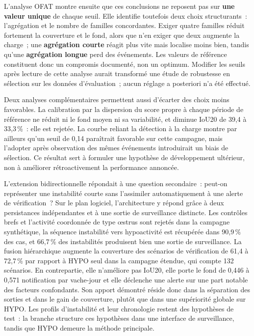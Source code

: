 L'analyse OFAT montre ensuite que ces conclusions ne reposent pas sur \textbf{une valeur unique} de
chaque seuil. Elle identifie toutefois deux choix structurants~: l'agrégation et le nombre de
familles concordantes. Exiger quatre familles réduit fortement la couverture et le fond, alors
que n'en exiger que deux augmente la charge~; une \textbf{agrégation courte} réagit plus vite mais
localise moins bien, tandis qu'une \textbf{agrégation longue} perd des événements. Les valeurs de
référence constituent donc un compromis documenté, non un optimum. Modifier les seuils après
lecture de cette analyse aurait transformé une étude de robustesse en sélection sur les
données d'évaluation~; aucun réglage a posteriori n'a été effectué.

Deux analyses complémentaires permettent aussi d'écarter des choix moins favorables. La
calibration par la dispersion du score propre à
chaque période de référence ne réduit ni le fond moyen ni sa variabilité, et diminue IoU20 de
39,4 à 33,3\,\%~: elle est rejetée. La courbe reliant la détection à la charge montre par
ailleurs qu'un seuil de 0,14 paraîtrait favorable sur cette campagne, mais l'adopter après
observation des mêmes événements introduirait un biais de sélection. Ce résultat sert à
formuler une hypothèse de développement ultérieur, non à améliorer rétroactivement la
performance annoncée.

L'extension bidirectionnelle répondait à une question secondaire~: peut-on représenter une
instabilité courte sans l'assimiler automatiquement à une alerte de vérification~? Sur le plan
logiciel, l'architecture y répond grâce à deux persistances indépendantes et à une sortie de
surveillance distincte. Les contrôles brefs et l'activité coordonnée de type œstrus sont
rejetés dans la campagne synthétique, la séquence instabilité vers hypoactivité est récupérée
dans 90,9\,\% des cas, et 66,7\,\% des instabilités produisent bien une sortie de
surveillance. La fusion hiérarchique augmente la couverture des scénarios de vérification de
61,4 à 72,7\,\% par rapport à HYPO seul dans la campagne étendue, qui compte 132 scénarios. En contrepartie, elle
n'améliore pas IoU20, elle porte le fond de 0,446 à 0,571 notification par vache-jour et elle
déclenche une alerte sur une part notable des facteurs confondants. Son apport démontré réside donc dans la séparation
des sorties et dans le gain de couverture, plutôt que dans une supériorité globale sur HYPO.
Les profils d'instabilité et leur chronologie restent des hypothèses de test~: la branche
structure ces hypothèses dans une interface de surveillance, tandis que HYPO demeure la
méthode principale.

